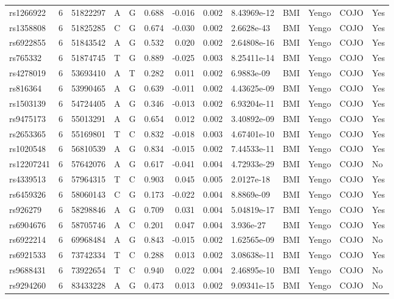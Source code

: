 \documentclass[11pt,twoside]{bristolthesis}
\begin{document}
\begin{longtable}[t]{lrlllrrrlllll}
rs1266922 & 6 & 51822297 & A & G & 0.688 & -0.016 & 0.002 & 8.43969e-12 & BMI & Yengo & COJO & Yes\\
rs1358808 & 6 & 51825285 & C & G & 0.674 & -0.030 & 0.002 & 2.6628e-43 & BMI & Yengo & COJO & Yes\\
rs6922855 & 6 & 51843542 & A & G & 0.532 & 0.020 & 0.002 & 2.64808e-16 & BMI & Yengo & COJO & Yes\\
\addlinespace
rs765332 & 6 & 51874745 & T & G & 0.889 & -0.025 & 0.003 & 8.25411e-14 & BMI & Yengo & COJO & Yes\\
rs4278019 & 6 & 53693410 & A & T & 0.282 & 0.011 & 0.002 & 6.9883e-09 & BMI & Yengo & COJO & Yes\\
rs816364 & 6 & 53990465 & A & G & 0.639 & -0.011 & 0.002 & 4.43625e-09 & BMI & Yengo & COJO & Yes\\
rs1503139 & 6 & 54724405 & A & G & 0.346 & -0.013 & 0.002 & 6.93204e-11 & BMI & Yengo & COJO & Yes\\
rs9475173 & 6 & 55013291 & A & G & 0.654 & 0.012 & 0.002 & 3.40892e-09 & BMI & Yengo & COJO & Yes\\
\addlinespace
rs2653365 & 6 & 55169801 & T & C & 0.832 & -0.018 & 0.003 & 4.67401e-10 & BMI & Yengo & COJO & Yes\\
rs1020548 & 6 & 56810539 & A & G & 0.834 & -0.015 & 0.002 & 7.44533e-11 & BMI & Yengo & COJO & Yes\\
rs12207241 & 6 & 57642076 & A & G & 0.617 & -0.041 & 0.004 & 4.72933e-29 & BMI & Yengo & COJO & No\\
rs4339513 & 6 & 57964315 & T & C & 0.903 & 0.045 & 0.005 & 2.0127e-18 & BMI & Yengo & COJO & Yes\\
rs6459326 & 6 & 58060143 & C & G & 0.173 & -0.022 & 0.004 & 8.8869e-09 & BMI & Yengo & COJO & Yes\\
\addlinespace
rs926279 & 6 & 58298846 & A & G & 0.709 & 0.031 & 0.004 & 5.04819e-17 & BMI & Yengo & COJO & Yes\\
rs6904676 & 6 & 58705746 & A & C & 0.201 & 0.047 & 0.004 & 3.936e-27 & BMI & Yengo & COJO & Yes\\
rs6922214 & 6 & 69968484 & A & G & 0.843 & -0.015 & 0.002 & 1.62565e-09 & BMI & Yengo & COJO & No\\
rs6921533 & 6 & 73742334 & T & C & 0.288 & 0.013 & 0.002 & 3.08638e-11 & BMI & Yengo & COJO & Yes\\
rs9688431 & 6 & 73922654 & T & C & 0.940 & 0.022 & 0.004 & 2.46895e-10 & BMI & Yengo & COJO & No\\
\addlinespace
rs9294260 & 6 & 83433228 & A & G & 0.473 & 0.013 & 0.002 & 9.09341e-15 & BMI & Yengo & COJO & No\\

\end{longtable}
\end{document}
